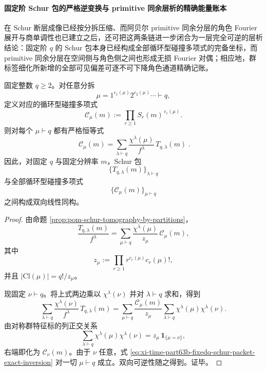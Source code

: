 \paragraph{固定阶 Schur 包的严格逆变换与 primitive 同余层析的精确能量账本}
在 Schur 断层成像已经按分拆压缩、而阿贝尔 primitive 同余分层的角色 Fourier 展开与商单调性也已建立之后，还可把这两条链进一步闭合为一层完全可逆的层析结论：固定阶 \(q\) 的 Schur 包本身已经构成全部循环型碰撞多项式的完备坐标，而 primitive 同余分层在空间侧与角色侧之间也形成无损 Fourier 对偶；相应地，群标签细化所新增的全部可见偏差可逐不可下降角色通道精确记账。

\begin{theorem}\label{thm:xi-time-part63b-fixedq-schur-packet-exact-inversion}
固定整数 \(q\ge 2\)。对任意分拆
\[
\mu=1^{c_1(\mu)}2^{c_2(\mu)}\cdots \vdash q,
\]
定义对应的循环型碰撞多项式
\[
\mathcal C_\mu(m):=\prod_{r\ge 1}S_r(m)^{\,c_r(\mu)}.
\]
则对每个 \(\mu\vdash q\) 都有严格恒等式
\begin{equation}\label{eq:xi-time-part63b-fixedq-schur-packet-exact-inversion}
\boxed{\;
\mathcal C_\mu(m)
=
\sum_{\lambda\vdash q}\frac{\chi^\lambda(\mu)}{f^\lambda}\,T_{q,\lambda}(m)\; }.
\end{equation}
因此，对固定 \(q\) 与固定分辨率 \(m\)，Schur 包
\[
\{T_{q,\lambda}(m)\}_{\lambda\vdash q}
\]
与全部循环型碰撞多项式
\[
\{\mathcal C_\mu(m)\}_{\mu\vdash q}
\]
之间构成双向线性同构。
\end{theorem}
\begin{proof}
由命题 \ref{prop:pom-schur-tomography-by-partitions}，
\[
\frac{T_{q,\lambda}(m)}{f^\lambda}
=
\sum_{\mu\vdash q}\frac{\chi^\lambda(\mu)}{z_\mu}\,\mathcal C_\mu(m),
\]
其中
\[
z_\mu:=\prod_{r\ge 1}r^{c_r(\mu)}c_r(\mu)!,
\]
并且 \(|\mathrm{Cl}(\mu)|=q!/z_\mu\)。

现固定 \(\nu\vdash q\)。将上式两边乘以 \(\chi^\lambda(\nu)\) 并对 \(\lambda\vdash q\) 求和，得到
\[
\sum_{\lambda\vdash q}\frac{\chi^\lambda(\nu)}{f^\lambda}\,T_{q,\lambda}(m)
=
\sum_{\mu\vdash q}\frac{\mathcal C_\mu(m)}{z_\mu}
\sum_{\lambda\vdash q}\chi^\lambda(\mu)\chi^\lambda(\nu).
\]
由对称群特征标的列正交关系
\[
\sum_{\lambda\vdash q}\chi^\lambda(\mu)\chi^\lambda(\nu)
=
z_\mu\,\mathbf 1_{\{\mu=\nu\}},
\]
右端即化为 \(\mathcal C_\nu(m)\)。由于 \(\nu\) 任意，式
\eqref{eq:xi-time-part63b-fixedq-schur-packet-exact-inversion} 对一切 \(\mu\vdash q\) 成立。双向可逆性随之得到。证毕。
\end{proof}

